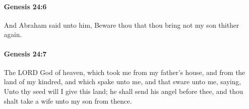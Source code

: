 		\paragraph{Genesis 24:6} %
			\label{GENESIS-24-6}

			And Abraham said unto him, Beware thou that thou bring not my son thither again.


		\paragraph{Genesis 24:7} %
			\label{GENESIS-24-7}

			The LORD God of heaven, which took me from my father's house, and from the land of my kindred, and which spake unto me, and that sware unto me, saying, Unto thy seed will I give this land; he shall send his angel before thee, and thou shalt take a wife unto my son from thence.


